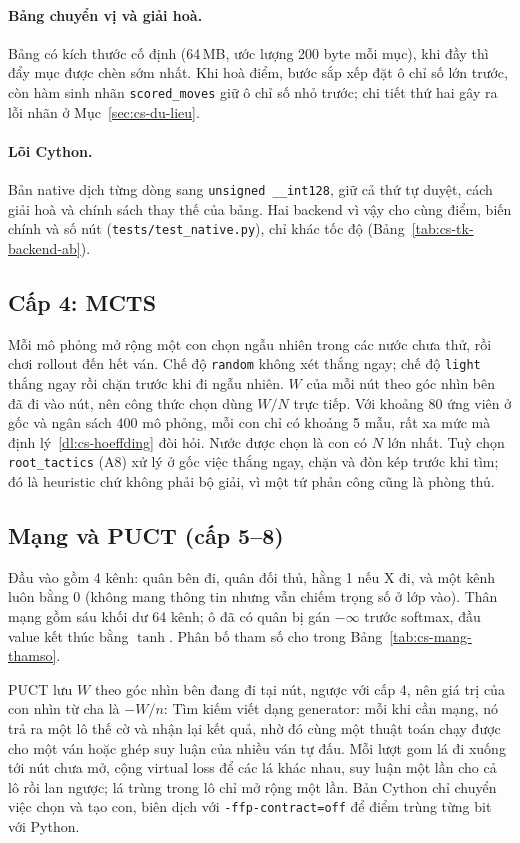 \paragraph{Bảng chuyển vị và giải hoà.} Bảng có kích thước cố định (64\,MB, ước lượng 200 byte mỗi mục), khi đầy thì
đẩy mục được chèn sớm nhất. Khi hoà điểm, bước sắp xếp đặt ô chỉ số lớn trước, còn hàm sinh nhãn
\texttt{scored\_moves} giữ ô chỉ số nhỏ trước; chi tiết thứ hai gây ra lỗi nhãn ở Mục~\ref{sec:cs-du-lieu}.

\paragraph{Lõi Cython.} Bản native dịch từng dòng sang \texttt{unsigned \_\_int128}, giữ cả thứ tự duyệt, cách giải
hoà và chính sách thay thế của bảng. Hai backend vì vậy cho cùng điểm, biến chính và số nút
(\texttt{tests/test\_native.py}), chỉ khác tốc độ (Bảng~\ref{tab:cs-tk-backend-ab}).

\subsection{Cấp 4: MCTS}
Mỗi mô phỏng mở rộng một con chọn ngẫu nhiên trong các nước chưa thử, rồi chơi rollout đến hết ván. Chế độ
\texttt{random} không xét thắng ngay; chế độ \texttt{light} thắng ngay rồi chặn trước khi đi ngẫu nhiên. $W$ của mỗi
nút theo góc nhìn bên đã đi vào nút, nên công thức chọn dùng $W/N$ trực tiếp. Với khoảng 80 ứng viên ở gốc và ngân
sách 400 mô phỏng, mỗi con chỉ có khoảng 5 mẫu, rất xa mức mà định lý~\ref{dl:cs-hoeffding} đòi hỏi. Nước được chọn là
con có $N$ lớn nhất. Tuỳ chọn \texttt{root\_tactics} (A8) xử lý ở gốc việc thắng ngay, chặn và đòn kép trước khi tìm;
đó là heuristic chứ không phải bộ giải, vì một tứ phản công cũng là phòng thủ.

\subsection{Mạng và PUCT (cấp 5--8)}
Đầu vào gồm 4 kênh: quân bên đi, quân đối thủ, hằng 1 nếu X đi, và một kênh luôn bằng 0 (không mang thông tin nhưng
vẫn chiếm trọng số ở lớp vào). Thân mạng gồm sáu khối dư 64 kênh; ô đã có quân bị gán $-\infty$ trước softmax, đầu
value kết thúc bằng $\tanh$. Phân bố tham số cho trong Bảng~\ref{tab:cs-mang-thamso}.

PUCT lưu $W$ theo góc nhìn bên đang đi tại nút, ngược với cấp 4, nên giá trị của con nhìn từ cha là $-W/n$:
Tìm kiếm viết dạng generator: mỗi khi cần mạng, nó trả ra một lô thế cờ và nhận lại kết quả, nhờ đó cùng một thuật
toán chạy được cho một ván hoặc ghép suy luận của nhiều ván tự đấu. Mỗi lượt gom lá đi xuống tới nút chưa mở, cộng
virtual loss để các lá khác nhau, suy luận một lần cho cả lô rồi lan ngược; lá trùng trong lô chỉ mở rộng một lần. Bản
Cython chỉ chuyển việc chọn và tạo con, biên dịch với \texttt{-ffp-contract=off} để điểm trùng từng bit với Python.

